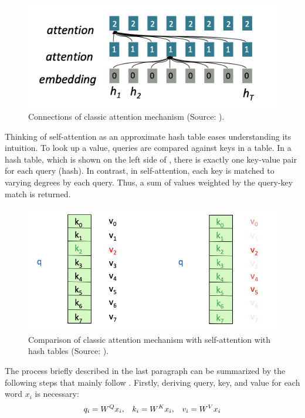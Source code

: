 \documentclass[
]{krantz}
\begin{document}
\begin{figure}

{\centering \includegraphics[width=0.7\linewidth]{./figures/01-01-nlp/transformer_self-attention_stanford} 

}

\caption{Connections of classic attention mechanism (Source: \citet{Manning2022}).}\label{fig:tfselfa}
\end{figure}



Thinking of self-attention as an approximate hash table eases
understanding its intuition. To look up a value, queries are compared
against keys in a table. In a hash table, which is shown on the left
side of , there is exactly one key-value pair for each query (hash). In
contrast, in self-attention, each key is matched to varying degrees by
each query. Thus, a sum of values weighted by the query-key match is
returned.

\begin{figure}

{\centering \includegraphics[width=0.7\linewidth]{./figures/01-01-nlp/transformer_hash-table_stanford} 

}

\caption{Comparison of classic attention mechanism with self-attention with hash tables (Source: \citet{Manning2022}).}\label{fig:tfhashtable}
\end{figure}



The process briefly described in the last paragraph can be summarized by
the following steps that mainly follow \citet{Manning2022}. Firstly, deriving
query, key, and value for each word \(x_i\) is necessary:
\[q_i = W^Q x_i , \hspace{3mm} k_i = W^K x_i, \hspace{3mm} v_i = W^V x_i\]
\end{document}
